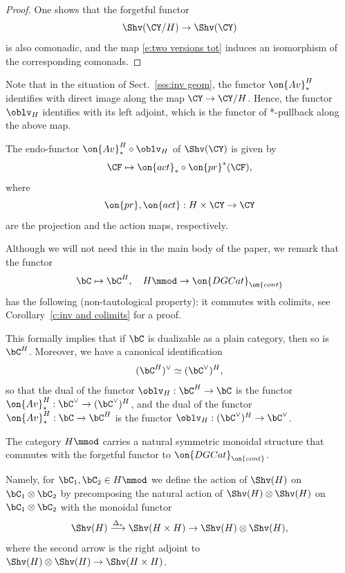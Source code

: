 \documentclass[9pt]{amsart}
\theoremstyle{definition}
\theoremstyle{remark}
\newcommand{\secref}[1]{Sect.~\ref{#1}}
\newcommand{\corref}[1]{Corollary~\ref{#1}}
\numberwithin{equation}{section}
\begin{document}
\begin{proof}

One shows that the forgetful functor
$$\Shv(\CY/H)\to \Shv(\CY)$$
is also comonadic, and the map \eqref{e:two versions tot} induces
an isomorphism of the corresponding comonads. 

\end{proof} 

\sssec{}

Note that in the situation of \secref{sss:inv geom}, the functor $\on{Av}^H_*$ identifies with direct image 
along the map $\CY\to \CY/H$. Hence, the functor $\oblv_H$ identifies with its left adjoint, which is the functor
of *-pullback along the above map.

\medskip

The endo-functor $\on{Av}^H_*\circ \oblv_H$ of $\Shv(\CY)$ is given by
$$\CF\mapsto \on{act}_*\circ \on{pr}^*(\CF),$$
where 
$$\on{pr},\on{act}:H\times \CY\to \CY$$
are the projection and the action maps, respectively. 

\sssec{} \label{sss:coinvariants and limits}

Although we will not need this in the main body of the paper, we remark that the functor
$$\bC\mapsto \bC^H, \quad H\mmod\to \on{DGCat}_{\on{cont}}$$
has the following (non-tautological property): it commutes with colimits, see \corref{c:inv and colimits} for a proof. 

\medskip

This formally implies that if $\bC$ is dualizable as a plain category, then so is $\bC^H$. Moreover, we have a 
canonical identification
$$(\bC^H)^\vee\simeq (\bC^\vee)^H,$$
so that the dual of the functor $\oblv_H:\bC^H\to \bC$ is the functor $\on{Av}^H_*:\bC^\vee\to (\bC^\vee)^H$, and
the dual of the functor $\on{Av}^H_*:\bC\to \bC^H$ is the functor $\oblv_H:(\bC^\vee)^H\to \bC^\vee$. 

\sssec{}

The category $H\mmod$ carries a natural symmetric monoidal structure that commutes with
the forgetful functor to $\on{DGCat}_{\on{cont}}$. 

\medskip

Namely, for $\bC_1,\bC_2\in H\mmod$ we define the action of $\Shv(H)$ on $\bC_1\otimes \bC_2$ by precomposing
the natural action of $\Shv(H)\otimes \Shv(H)$ on $\bC_1\otimes \bC_2$ with the monoidal functor
$$\Shv(H) \overset{\Delta_*}\longrightarrow \Shv(H\times H) \to \Shv(H)\otimes \Shv(H),$$
where the second arrow is the right adjoint to $\Shv(H)\otimes \Shv(H)\to \Shv(H\times H)$. 
\end{document}
